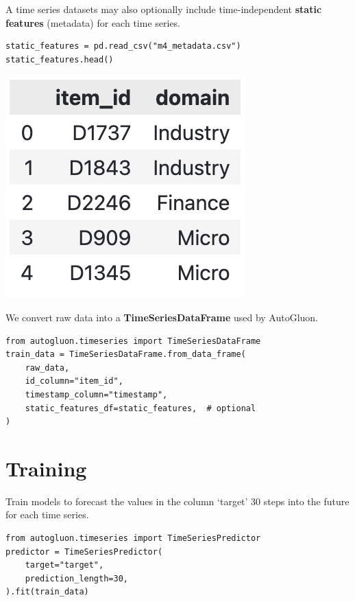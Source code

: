 \medskip

A time series datasets may also optionally include time-independent \textbf{static features} (metadata) for each time series.

\begin{verbatim}
static_features = pd.read_csv("m4_metadata.csv")
static_features.head()
\end{verbatim}

\begin{center}
\includegraphics[width=0.30\linewidth]{timeseries/images/static_features.png}
\end{center}

\medskip

We convert raw data into a \textbf{TimeSeriesDataFrame} used by AutoGluon.

\begin{verbatim}
from autogluon.timeseries import TimeSeriesDataFrame
train_data = TimeSeriesDataFrame.from_data_frame(
    raw_data,
    id_column="item_id",
    timestamp_column="timestamp",
    static_features_df=static_features,  # optional
)
\end{verbatim}


\vfill\null
\columnbreak

\section*{Training}

Train models to forecast the values in the column ‘target’ 30 steps into the future for each time series.

\begin{verbatim}
from autogluon.timeseries import TimeSeriesPredictor
predictor = TimeSeriesPredictor(
    target="target",
    prediction_length=30,
).fit(train_data)
\end{verbatim}

